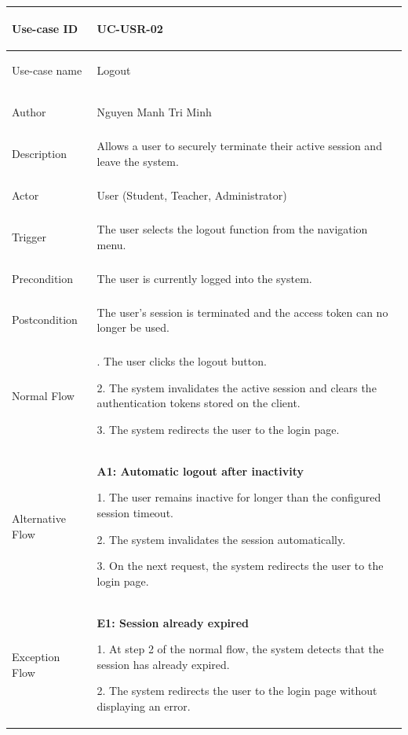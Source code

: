 {
\renewcommand{\arraystretch}{1.1}
\setlength{\tabcolsep}{8pt}
\begin{longtable}{|>{\bfseries\raggedright\arraybackslash}p{}|>{\raggedright\arraybackslash}p{}|}
\hline
Use-case ID & UC-USR-02 \\ \hline
Use-case name & Logout \\ \hline
Author & Nguyen Manh Tri Minh \\ \hline
Description & Allows a user to securely terminate their active session and leave the system. \\ \hline
Actor & User (Student, Teacher, Administrator) \\ \hline
Trigger & The user selects the logout function from the navigation menu. \\ \hline
Precondition & The user is currently logged into the system. \\ \hline
Postcondition & The user's session is terminated and the access token can no longer be used. \\ \hline
Normal Flow &
1. The user clicks the logout button. \par
2. The system invalidates the active session and clears the authentication tokens stored on the client. \par
3. The system redirects the user to the login page. \\ \hline
Alternative Flow &
\textbf{A1: Automatic logout after inactivity} \par
1. The user remains inactive for longer than the configured session timeout. \par
2. The system invalidates the session automatically. \par
3. On the next request, the system redirects the user to the login page. \\ \hline
Exception Flow &
\textbf{E1: Session already expired} \par
1. At step 2 of the normal flow, the system detects that the session has already expired. \par
2. The system redirects the user to the login page without displaying an error. \\ \hline
\end{longtable}
}

